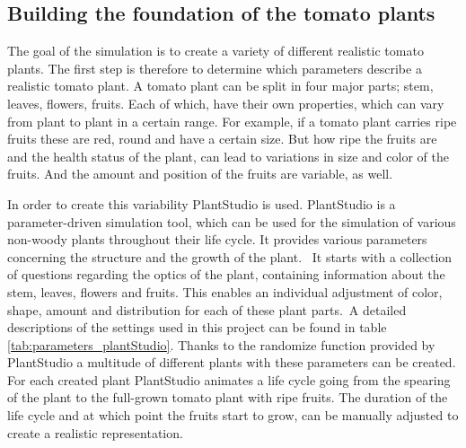 \subsection{Building the foundation of the tomato plants}

The goal of the simulation is to create a variety of different realistic tomato plants. The first step is therefore to determine which parameters describe a realistic tomato plant. A tomato plant can be split in four major parts; stem, leaves, flowers, fruits. Each of which, have their own properties, which can vary from plant to plant in a certain range. For example, if a tomato plant carries ripe fruits these are red, round and have a certain size. But how ripe the fruits are and the health status of the plant, can lead to variations in size and color of the fruits. And the amount and position of the fruits are variable, as well. 

In order to create this variability PlantStudio is used. PlantStudio is a parameter-driven simulation tool, which can be used for the simulation of various non-woody plants throughout their life cycle. It provides various parameters concerning the structure and the growth of the plant.  It starts with a collection of questions regarding the optics of the plant, containing information about the stem, leaves, flowers and fruits. This enables an individual adjustment of color, shape, amount and distribution for each of these plant parts. A detailed descriptions of the settings used in this project can be found in table \ref{tab:parameters_plantStudio}. Thanks to the randomize function provided by PlantStudio a multitude of different plants with these parameters can be created.\\

For each created plant PlantStudio animates a life cycle going from the spearing of the plant to the full-grown tomato plant with ripe fruits. The duration of the life cycle and at which point the fruits start to grow, can be manually adjusted to create a realistic representation. \\




